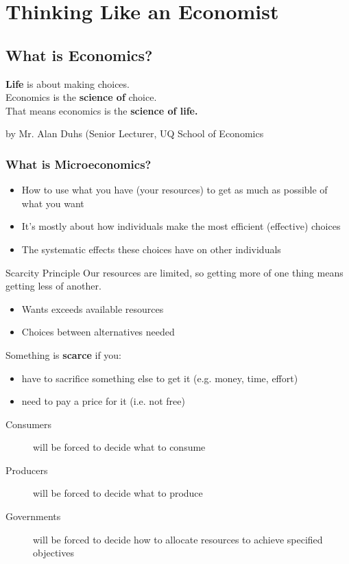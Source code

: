 \section{Thinking Like an Economist}
\subsection{What is Economics?}
\begin{leftbar}
	\noindent\textbf{Life} is about making choices.\\
	Economics is the \textbf{science of} choice.\\
	That means economics is the \textbf{science of life.}
\end{leftbar}
by Mr. Alan Duhs (Senior Lecturer, UQ School of Economics
\subsubsection{What is Microeconomics?}
\begin{itemize}
	\item How to use what you have (your resources) to get as much as possible of what you want
	\item It's mostly about how individuals make the most efficient (effective) choices
	\item The systematic effects these choices have on other individuals
\end{itemize}

\begin{note}{Scarcity Principle}
	Our resources are limited, so getting more of one thing means getting less of another.
	\begin{itemize}
		\item Wants exceeds available resources
		\item Choices between alternatives needed
	\end{itemize}
	Something is \textbf{scarce} if you:
	\begin{itemize}
		\item have to sacrifice something else to get it (e.g. money, time, effort)
		\item need to pay a price for it (i.e. not free)
	\end{itemize}
	\begin{description}
		\item[Consumers] will be forced to decide what to consume
		\item[Producers] will be forced to decide what to produce
		\item[Governments] will be forced to decide how to allocate resources to achieve specified objectives
	\end{description}
\end{note}

